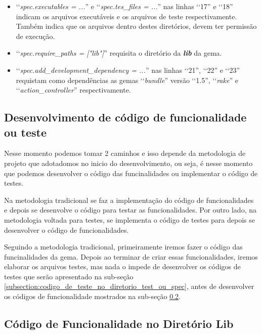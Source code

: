 \begin{itemize}
 \item ‘‘\emph{spec.executables = ...}'' e ‘‘\emph{spec.tes\_files = ...}'' nas linhas ‘‘17'' e ‘‘18''
 indicam os arquivos executáveis e os arquivos de teste respectivamente. Também indica que os arquivos dentro
 destes diretórios, devem ter permissão de execução.

 \item ‘‘\emph{spec.require\_paths = ["lib"]}'' requisita o diretório da \emph{\textbf{lib}} da gema.

 \item ‘‘\emph{spec.add\_development\_dependency = ...}'' nas linhas ‘‘21'', ‘‘22'' e ‘‘23'' requistam como
 dependências as gemas ‘‘\emph{bundle}'' versão ‘‘1.5'', ‘‘\emph{rake}'' e ‘‘\emph{action\_controller}''
 respectivamente.

\end{itemize}


\subsection{Desenvolvimento de código de funcionalidade ou teste}
\label{subsection:desenvolvimento_de_codigo_de_funcionalidade_ou_teste}

Nesse momento podemos tomar 2 caminhos e isso depende da metodologia de projeto que adotadomos no inicio
do desenvolvimento, ou seja, é nesse momento que podemos desenvolver o código das funcinalidades
ou implementar o código de testes.

Na metodologia tradicional se faz a implementação do código de funcionalidades e depois se
desenvolve o código para testar as funcionalidades. Por outro lado, na metodologia voltada para
testes, se implementa o código de testes para depois se desenvolver o código de funcionalidades.

Seguindo a metodologia tradicional, primeiramente iremos fazer o código das funcinalidades da gema.
Depois ao terminar de criar essas funcionalidades, iremos elaborar os arquivos testes, mas nada o impede
de desenvolver os códigos de testes que serão apresentado na sub-seção
\ref{subsection:codigo_de_teste_no_diretorio_test_ou_spec}, antes de desenvolver os códigos de funcionalidade
mostrados na sub-seção \ref{subsection:codigo_de_funcionalidade_no_diretorio_lib}.

\subsection{Código de Funcionalidade no Diretório Lib}
\label{subsection:codigo_de_funcionalidade_no_diretorio_lib}

